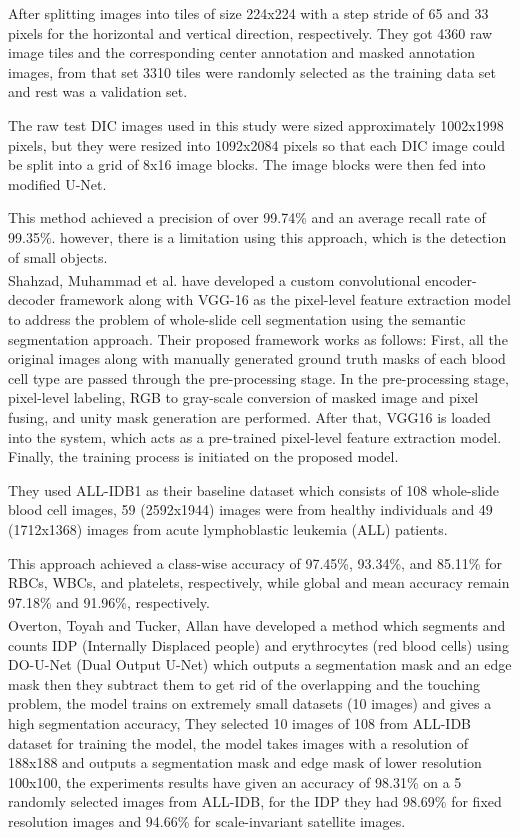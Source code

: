 {After splitting images into tiles of size 224x224 with a step stride of 65 and 33 pixels for the horizontal and vertical direction, respectively. They got 4360 raw image tiles and the corresponding center annotation and masked annotation images, from that set 3310 tiles were randomly selected as the training data set and rest was a validation set.

The raw test DIC images used in this study were sized approximately 1002x1998 pixels, but they were resized into 1092x2084 pixels so that each DIC image could be split into a grid of 8x16 image blocks. The image blocks were then fed into modified U-Net.

This method achieved a precision of over 99.74\% and an average recall rate of 99.35\%. however, there is a limitation using this approach, which is the detection of small objects.\\

Shahzad, Muhammad et al. \textsuperscript{\cite{shahzad2020robust}} have developed a custom convolutional encoder-decoder framework along with VGG-16 as the pixel-level feature extraction model to address the problem of whole-slide cell segmentation using the semantic segmentation approach. Their proposed framework works as follows: First, all the original images along with manually generated ground truth masks of each blood cell type are passed through the pre-processing stage. In the pre-processing stage, pixel-level labeling, RGB to gray-scale conversion of masked image and pixel fusing, and unity mask generation are performed. After that, VGG16 is loaded into the system, which acts as a pre-trained pixel-level feature extraction model. Finally, the training process is initiated on the proposed model.

They used ALL-IDB1 as their baseline dataset which consists of 108 whole-slide blood cell images, 59 (2592x1944) images were from healthy individuals and 49 (1712x1368) images from acute lymphoblastic leukemia (ALL) patients.

This approach achieved a class-wise accuracy of 97.45\%, 93.34\%, and 85.11\% for RBCs, WBCs, and platelets, respectively, while global and mean accuracy remain 97.18\% and 91.96\%, respectively.\\

Overton, Toyah and Tucker, Allan \textsuperscript{\cite{10.1007/978-3-030-44584-3_31}} have developed a method which segments and counts IDP (Internally Displaced people) and erythrocytes (red blood cells) using DO-U-Net (Dual Output U-Net) which outputs a segmentation mask and an edge mask then they subtract them to get rid of the overlapping and the touching problem, the model trains on extremely small datasets (10 images) and gives a high segmentation accuracy, They selected 10 images of 108 from ALL-IDB dataset for training the model, the model takes images with a resolution of 188x188 and outputs a segmentation mask and edge mask of lower resolution 100x100, the experiments results have given an accuracy of 98.31\% on a 5 randomly selected images from ALL-IDB, for the IDP they had 98.69\% for fixed resolution images and 94.66\% for scale-invariant satellite images.\\

}
